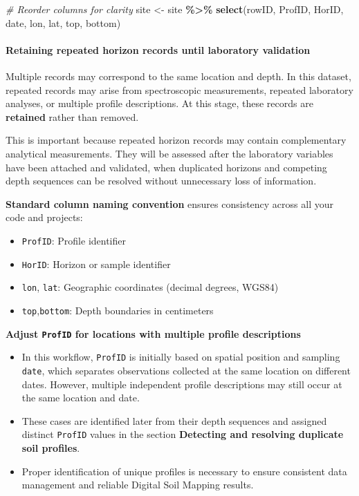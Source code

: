 \documentclass[
  10pt,
  b5paper,
  oneside]{book}
\newenvironment{Shaded}{\begin{snugshade}}{\end{snugshade}}
\newcommand{\CommentTok}[1]{\textcolor[rgb]{0.56,0.35,0.01}{\textit{#1}}}
\newcommand{\FunctionTok}[1]{\textcolor[rgb]{0.13,0.29,0.53}{\textbf{#1}}}
\newcommand{\NormalTok}[1]{#1}
\newcommand{\OtherTok}[1]{\textcolor[rgb]{0.56,0.35,0.01}{#1}}
\newcommand{\SpecialCharTok}[1]{\textcolor[rgb]{0.81,0.36,0.00}{\textbf{#1}}}
\begin{document}
\begin{Shaded}
\begin{Highlighting}[]
\CommentTok{\# Reorder columns for clarity}
\NormalTok{site }\OtherTok{\textless{}{-}}\NormalTok{ site }\SpecialCharTok{\%\textgreater{}\%}
  \FunctionTok{select}\NormalTok{(rowID, ProfID, HorID, date, lon, lat, top, bottom)}
\end{Highlighting}
\end{Shaded}

\paragraph{Retaining repeated horizon records until laboratory validation}\label{retaining-repeated-horizon-records-until-laboratory-validation}

Multiple records may correspond to the same location and depth. In this dataset, repeated records may arise from spectroscopic measurements, repeated laboratory analyses, or multiple profile descriptions. At this stage, these records are \textbf{retained} rather than removed.

This is important because repeated horizon records may contain complementary analytical measurements. They will be assessed after the laboratory variables have been attached and validated, when duplicated horizons and competing depth sequences can be resolved without unnecessary loss of information.

\textbf{Standard column naming convention} ensures consistency across all your code and projects:

\begin{itemize}
\item
  \texttt{ProfID}: Profile identifier
\item
  \texttt{HorID}: Horizon or sample identifier
\item
  \texttt{lon}, \texttt{lat}: Geographic coordinates (decimal degrees, WGS84)
\item
  \texttt{top},\texttt{bottom}: Depth boundaries in centimeters
\end{itemize}

\textbf{Adjust \texttt{ProfID} for locations with multiple profile descriptions}

\begin{itemize}
\item
  In this workflow, \texttt{ProfID} is initially based on spatial position and sampling \texttt{date}, which separates observations collected at the same location on different dates. However, multiple independent profile descriptions may still occur at the same location and date.
\item
  These cases are identified later from their depth sequences and assigned distinct \texttt{ProfID} values in the section \textbf{Detecting and resolving duplicate soil profiles}.
\item
  Proper identification of unique profiles is necessary to ensure consistent data management and reliable Digital Soil Mapping results.
\end{itemize}
\end{document}
